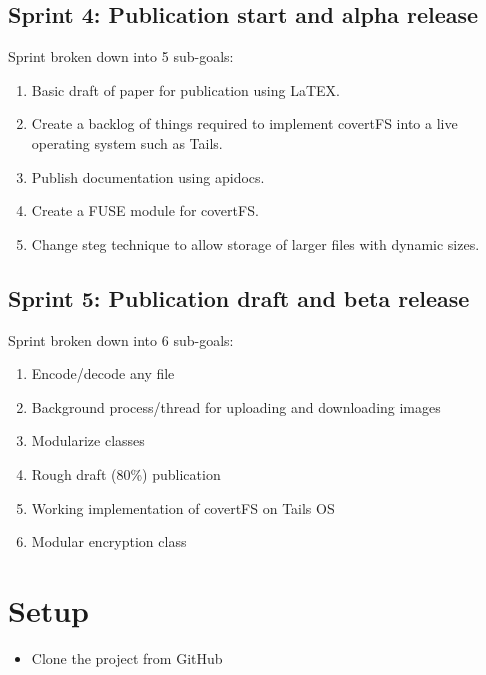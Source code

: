 \documentclass[letterpaper,10pt,english]{sphinxmanual}
\begin{document}
\section{Sprint 4: Publication start and alpha release}
\label{index:sprint-4-publication-start-and-alpha-release}
Sprint broken down into 5 sub-goals:
\begin{enumerate}
\item {} 
Basic draft of paper for publication using LaTEX.

\item {} 
Create a backlog of things required to implement covertFS into a live operating system such as Tails.

\item {} 
Publish documentation using apidocs.

\item {} 
Create a FUSE module for covertFS.

\item {} 
Change steg technique to allow storage of larger files with dynamic sizes.

\end{enumerate}


\section{Sprint 5: Publication draft and beta release}
\label{index:sprint-5-publication-draft-and-beta-release}
Sprint broken down into 6 sub-goals:
\begin{enumerate}
\item {} 
Encode/decode any file

\item {} 
Background process/thread for uploading and downloading images

\item {} 
Modularize classes

\item {} 
Rough draft (80\%) publication

\item {} 
Working implementation of covertFS on Tails OS

\item {} 
Modular encryption class

\end{enumerate}


\chapter{Setup}
\label{index:setup}\begin{itemize}
\item {} 
Clone the project from GitHub 

\end{itemize}
\end{document}
